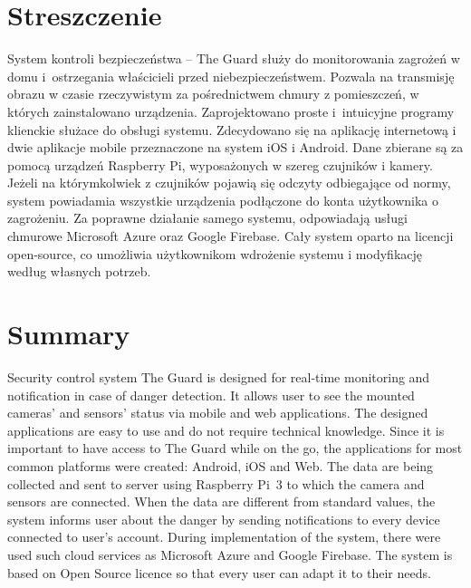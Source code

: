 \chapter*{Streszczenie}
System kontroli bezpieczeństwa – The Guard służy do monitorowania zagrożeń w domu i~ostrzegania właścicieli przed niebezpieczeństwem. Pozwala na transmisję obrazu w czasie rzeczywistym za pośrednictwem chmury z pomieszczeń, w których zainstalowano urządzenia.
Zaprojektowano proste i~intuicyjne programy klienckie służace do obsługi systemu.
Zdecydowano się na aplikację internetową i dwie aplikacje mobile przeznaczone na system iOS i Android.
Dane zbierane są za pomocą urządzeń Raspberry Pi, wyposażonych w szereg czujników i kamery.
Jeżeli na którymkolwiek z czujników pojawią się odczyty odbiegające od normy, system powiadamia wszystkie urządzenia podłączone do konta użytkownika o zagrożeniu.
Za poprawne działanie samego systemu, odpowiadają usługi chmurowe Microsoft Azure oraz Google Firebase.
Cały system oparto na licencji open-source, co umożliwia użytkownikom wdrożenie systemu i modyfikację według własnych potrzeb.

{\let\clearpage\relax\chapter*{Summary}}


Security control system The Guard is designed for real-time monitoring and notification in case of danger detection. It allows user to see the mounted cameras' and sensors' status via mobile and web applications. 
The designed applications are easy to use and do not require technical knowledge. Since it is important to have access to The Guard while on the go, the applications for most common platforms were created: Android, iOS and Web. The data are being collected and sent to server using Raspberry Pi~3 to which the camera and sensors are connected. When the data are different from standard values, the system informs user about the danger by sending notifications to every device connected to user's account. During implementation of the system, there were used such cloud services as Microsoft Azure and Google Firebase. The system is based on Open Source licence so that every user can adapt it to their needs.

